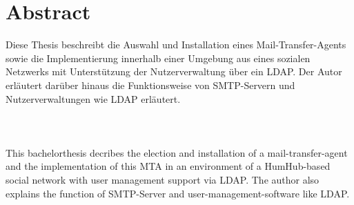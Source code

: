 


\chapter*{Abstract}
\label{sec:Abstract}

Diese Thesis beschreibt die Auswahl und Installation eines Mail-Transfer-Agents sowie die Implementierung innerhalb einer Umgebung aus eines sozialen Netzwerks mit Unterstützung der Nutzerverwaltung über ein LDAP. Der Autor erläutert darüber hinaus die Funktionsweise von SMTP-Servern und Nutzerverwaltungen wie LDAP erläutert.
\\
\\
\\
\\
This bachelorthesis decribes the election and installation of a mail-transfer-agent and the implementation of this MTA in an environment of a HumHub-based social network with user management support via LDAP. The author also explains the function of SMTP-Server and user-management-software like LDAP.